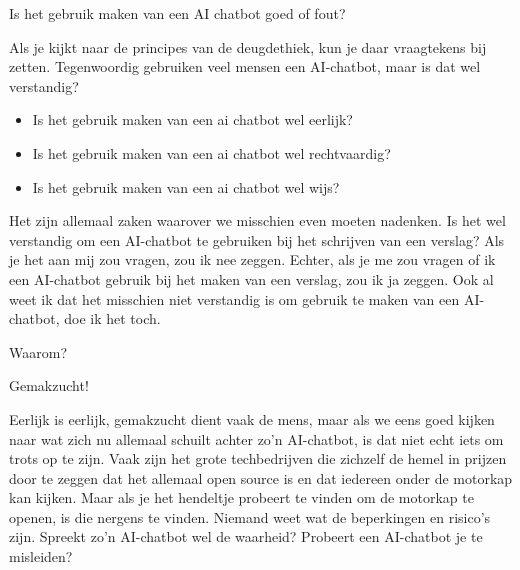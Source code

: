 \begin{center}
    Is het gebruik maken van een AI chatbot goed of fout?
\end{center}

\vspace{1cm}


Als je kijkt naar de principes van de deugdethiek, kun je daar vraagtekens bij zetten. Tegenwoordig gebruiken veel mensen een AI-chatbot, maar is dat wel verstandig?

\begin{itemize}
    \item Is het gebruik maken van een ai chatbot wel eerlijk?
    \item Is het gebruik maken van een ai chatbot wel rechtvaardig?
    \item Is het gebruik maken van een ai chatbot wel wijs?
\end{itemize}

Het zijn allemaal zaken waarover we misschien even moeten nadenken. Is het wel verstandig om een AI-chatbot te gebruiken bij het schrijven van een verslag? Als je het aan mij zou vragen, zou ik nee zeggen. Echter, als je me zou vragen of ik een AI-chatbot gebruik bij het maken van een verslag, zou ik ja zeggen. Ook al weet ik dat het misschien niet verstandig is om gebruik te maken van een AI-chatbot, doe ik het toch.

\vspace{.5cm}
Waarom? 

Gemakzucht! 
\vspace{.5cm}

Eerlijk is eerlijk, gemakzucht dient vaak de mens, maar als we eens goed kijken naar wat zich nu allemaal schuilt achter zo'n AI-chatbot, is dat niet echt iets om trots op te zijn. Vaak zijn het grote techbedrijven die zichzelf de hemel in prijzen door te zeggen dat het allemaal open source is en dat iedereen onder de motorkap kan kijken. Maar als je het hendeltje probeert te vinden om de motorkap te openen, is die nergens te vinden. Niemand weet wat de beperkingen en risico's zijn. Spreekt zo'n AI-chatbot wel de waarheid? Probeert een AI-chatbot je te misleiden?

\vspace{.25cm}

